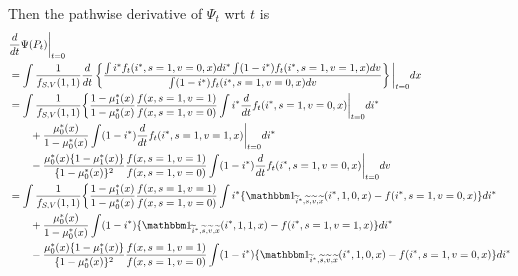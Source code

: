 \begin{appendix}
Then the pathwise derivative of $\Psi_t$ wrt $t$ is
\begin{align*}
   &\frac{d}{dt} \Psi(P_t)\bigg\vert_{t=0} \\
   &= \int \dfrac{1}{f_{S,V}(1, 1)} \frac{d}{dt} \left\{\dfrac{\int i^* f_t(i^*, s=1,v=0,x)di^* \int (1 - i^*)  f_t(i^*, s=1, v=1, x)dv}{\int(1 - i^*)  f_t(i^*, s=1, v=0, x)dv} \right\} \bigg\vert_{t=0}dx \\
   &= \int \dfrac{1}{f_{S,V}(1, 1)}\bigg\{ \dfrac{1 - \mu^*_1(x)}{1-\mu^*_0(x)} \dfrac{f(x, s=1, v=1)}{f(x, s=1, v=0)}\int i^* \frac{d}{dt} f_t(i^*, s=1,v=0,x) \bigg\vert_{t=0} di^* \\
   &\qquad + \dfrac{\mu^*_0(x)}{1 - \mu^*_0(x)} \int (1-i^*) \frac{d}{dt}f_t(i^*, s=1, v=1, x) \bigg\vert_{t=0} di^* \\ 
   &\qquad - \dfrac{\mu^*_0(x)\{1 - \mu^*_1(x)\}}{\{1 - \mu^*_0(x)\}^2} \dfrac{f(x, s=1, v=1)}{f(x, s=1, v =0)} \int (1-i^*) \frac{d}{dt}f_t(i^*, s=1, v=0, x) \bigg\vert_{t=0} dv \\
   &= \int \dfrac{1}{f_{S,V}(1, 1)}\bigg\{  \dfrac{1 - \mu^*_1(x)}{1-\mu^*_0(x)} \dfrac{f(x, s=1, v=1)}{f(x, s=1, v=0)}\int i^* \{ \mathbbm 1_{\widetilde i^*, \widetilde s, \widetilde v, \widetilde x}(i^*, 1, 0, x) - f(i^*, s=1,v=0,x) \} di^* \\
   &\qquad + \dfrac{\mu^*_0(x)}{1-\mu^*_0(x)} \int (1 - i^*) \{\mathbbm 1_{\widetilde i^*, \widetilde s, \widetilde v, \widetilde x}(i^*, 1, 1, x) - f(i^*, s=1, v=1, x) \} di^* \\ 
   &\qquad -\dfrac{\mu^*_0(x)\{1 - \mu^*_1(x)\}}{\{1 - \mu^*_0(x)\}^2} \dfrac{f(x, s=1, v=1)}{f(x, s=1, v =0)} \int (1 - i^*) \{\mathbbm 1_{\widetilde i^*, \widetilde s, \widetilde v, \widetilde x}(i^*, 1, 0, x) - f(i^*, s=1, v=0, x) \} di^*  \\

\end{align*}
\end{appendix}
